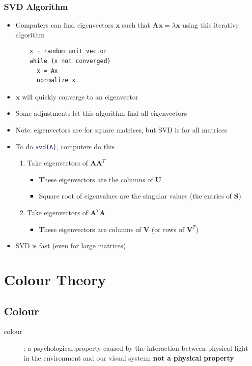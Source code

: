 \documentclass[letterpaper,12pt]{article}
\newcommand{\vect}[1]{\mathbf{#1}}
\newcommand{\matr}[1]{\mathbf{#1}}
\begin{document}
\subsubsection{SVD Algorithm}
\begin{itemize}
 \item Computers can find eigenvectors $\vect{x}$ such that $\matr{A}\vect{x} = \lambda\vect{x}$ using this iterative algorithm
       \begin{lstlisting}
    x = random unit vector
    while (x not converged)
      x = Ax
      normalize x
  \end{lstlisting}
 \item $\vect{x}$ will quickly converge to an eigenvector
 \item Some adjustments let this algorithm find all eigenvectors
 \item Note: eigenvectors are for square matrices, but SVD is for all matrices
 \item To do \lstinline[language=matlab]{svd(A)}, computers do this
       \begin{enumerate}
        \item Take eigenvectors of $\matr{A}\matr{A}^T$
              \begin{itemize}
               \item These eigenvectors are the columns of $\matr{U}$
               \item Square root of eigenvalues are the singular values (the entries of $\matr{S}$)
              \end{itemize}
        \item Take eigenvectors of $\matr{A}^T\matr{A}$
              \begin{itemize}
               \item These eigenvectors are columns of $\matr{V}$ (or rows of $\matr{V}^T$)
              \end{itemize}
       \end{enumerate}
 \item SVD is fast (even for large matrices)
\end{itemize}

\section{Colour Theory}
\subsection{Colour}
\begin{description}
 \item[colour]: a psychological property caused by the interaction between physical light in the environment and our visual system; \textbf{not a physical property}
\end{description}
\end{document}
